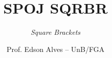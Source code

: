 \title{SPOJ SQRBR}
\subtitle{\textit{Square Brackets}}
\author{Prof. Edson Alves -- UnB/FGA}
\date{}
